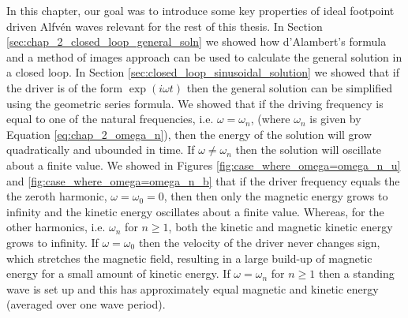 In this chapter, our goal was to introduce some key properties of ideal footpoint driven Alfv\'en waves relevant for the rest of this thesis. In Section \ref{sec:chap_2_closed_loop_general_soln} we showed how d'Alambert's formula and a method of images approach can be used to calculate the general solution in a closed loop. In Section \ref{sec:closed_loop_sinusoidal_solution} we showed that if the driver is of the form $\exp(i\omega t)$ then the general solution can be simplified using the geometric series formula. We showed that if the driving frequency is equal to one of the natural frequencies, i.e. $\omega = \omega_n$, (where $\omega_n$ is given by Equation \ref{eq:chap_2_omega_n}), then the energy of the solution will grow quadratically and ubounded in time. If $\omega\ne\omega_n$ then the solution will oscillate about a finite value. We showed in Figures \ref{fig:case_where_omega=omega_n_u} and \ref{fig:case_where_omega=omega_n_b} that if the driver frequency equals the the zeroth harmonic, $\omega=\omega_0=0$, then then only the magnetic energy grows to infinity and the kinetic energy oscillates about a finite value. Whereas, for the other harmonics, i.e. $\omega_n$ for $n\ge1$, both the kinetic and magnetic kinetic energy grows to infinity. If $\omega=\omega_0$ then the velocity of the driver never changes sign, which stretches the magnetic field, resulting in a large build-up of magnetic energy for a small amount of kinetic energy. If $\omega=\omega_n$ for $n\ge 1$ then a standing wave is set up and this has approximately equal magnetic and kinetic energy (averaged over one wave period).

